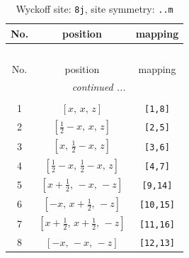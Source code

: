 \documentclass[fleqn,8pt]{jsarticle}
\begin{document}
\begin{longtable}{ccc}
\caption{Wyckoff site: {\tt 8j}, site symmetry: {\tt ..m}}
 \\
 \hline \hline
No. & position & mapping \\ \hline \endfirsthead

\multicolumn{2}{l}{\tablename\ \thetable{}} \\
 \hline \hline
No. & position & mapping \\ \hline \endhead

 \hline \hline
\multicolumn{2}{r}{\footnotesize\it continued ...} \\ \endfoot

 \hline \hline
\multicolumn{2}{r}{} \\ \endlastfoot

1 & $\left[ x,\, x,\, z \right]$ & {\tt [1,8]} \\ \hline
2 & $\left[ \frac{1}{2} - x,\, x,\, z \right]$ & {\tt [2,5]} \\ \hline
3 & $\left[ x,\, \frac{1}{2} - x,\, z \right]$ & {\tt [3,6]} \\ \hline
4 & $\left[ \frac{1}{2} - x,\, \frac{1}{2} - x,\, z \right]$ & {\tt [4,7]} \\ \hline
5 & $\left[ x + \frac{1}{2},\, - x,\, - z \right]$ & {\tt [9,14]} \\ \hline
6 & $\left[ - x,\, x + \frac{1}{2},\, - z \right]$ & {\tt [10,15]} \\ \hline
7 & $\left[ x + \frac{1}{2},\, x + \frac{1}{2},\, - z \right]$ & {\tt [11,16]} \\ \hline
8 & $\left[ - x,\, - x,\, - z \right]$ & {\tt [12,13]} \\
\end{longtable}
\renewcommand{\arraystretch}{1.2}
\end{document}
